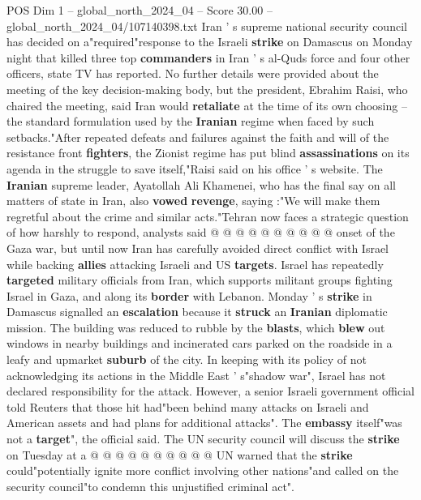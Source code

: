 \begin{textsample}{POS Dim 1 – global\_north\_2024\_04 – Score 30.00 – global\_north\_2024\_04/107140398.txt}  \label{ex:f1_pos_153}
Iran ' s supreme national security council has decided on a"required"response to the Israeli \textbf{strike} on Damascus on Monday night that killed three top \textbf{commanders} in Iran ' s al-Quds force and four other officers, state TV has reported.
No further details were provided about the meeting of the key decision-making body, but the president, Ebrahim Raisi, who chaired the meeting, said Iran would \textbf{retaliate} at the time of its own choosing -- the standard formulation used by the \textbf{Iranian} regime when faced by such setbacks."After repeated defeats and failures against the faith and will of the resistance front \textbf{fighters}, the Zionist regime has put blind \textbf{assassinations} on its agenda in the struggle to save itself,"Raisi said on his office ' s website.
The \textbf{Iranian} supreme leader, Ayatollah Ali Khamenei, who has the final say on all matters of state in Iran, also \textbf{vowed} \textbf{revenge}, saying :"We will make them regretful about the crime and similar acts."Tehran now faces a strategic question of how harshly to respond, analysts said @ @ @ @ @ @ @ @ @ @ onset of the Gaza war, but until now Iran has carefully avoided direct conflict with Israel while backing \textbf{allies} attacking Israeli and US \textbf{targets}.
Israel has repeatedly \textbf{targeted} military officials from Iran, which supports militant groups fighting Israel in Gaza, and along its \textbf{border} with Lebanon.
Monday ' s \textbf{strike} in Damascus signalled an \textbf{escalation} because it \textbf{struck} an \textbf{Iranian} diplomatic mission.
The building was reduced to rubble by the \textbf{blasts}, which \textbf{blew} out windows in nearby buildings and incinerated cars parked on the roadside in a leafy and upmarket \textbf{suburb} of the city.
In keeping with its policy of not acknowledging its actions in the Middle East ' s"shadow war", Israel has not declared responsibility for the attack.
However, a senior Israeli government official told Reuters that those hit had"been behind many attacks on Israeli and American assets and had plans for additional attacks".
The \textbf{embassy} itself"was not a \textbf{target}", the official said.
The UN security council will discuss the \textbf{strike} on Tuesday at a @ @ @ @ @ @ @ @ @ @ UN warned that the \textbf{strike} could"potentially ignite more conflict involving other nations"and called on the security council"to condemn this unjustified criminal act".

\end{textsample}
